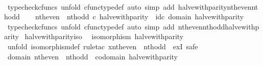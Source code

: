 \begin{isabellebody}
\ \ \ \ \isamarkupfalse%
\ {\isacharparenleft}{\kern0pt}typecheck{\isacharunderscore}{\kern0pt}cfuncs{\isacharcomma}{\kern0pt}\ unfold\ cfunc{\isacharunderscore}{\kern0pt}type{\isacharunderscore}{\kern0pt}def{\isacharcomma}{\kern0pt}\ auto\ simp\ add{\isacharcolon}{\kern0pt}\ halve{\isacharunderscore}{\kern0pt}with{\isacharunderscore}{\kern0pt}parity{\isacharunderscore}{\kern0pt}nth{\isacharunderscore}{\kern0pt}even{\isacharunderscore}{\kern0pt}nth{\isacharunderscore}{\kern0pt}odd{\isacharparenright}{\kern0pt}\isanewline
\ \ \isamarkupfalse%
\ {\isachardoublequoteopen}nth{\isacharunderscore}{\kern0pt}even\ {\isasymamalg}\ nth{\isacharunderscore}{\kern0pt}odd\ {\isasymcirc}\isactrlsub c\ halve{\isacharunderscore}{\kern0pt}with{\isacharunderscore}{\kern0pt}parity\ {\isacharequal}{\kern0pt}\ id\isactrlsub c\ {\isacharparenleft}{\kern0pt}domain\ halve{\isacharunderscore}{\kern0pt}with{\isacharunderscore}{\kern0pt}parity{\isacharparenright}{\kern0pt}{\isachardoublequoteclose}\isanewline
\ \ \ \ \isamarkupfalse%
\ {\isacharparenleft}{\kern0pt}typecheck{\isacharunderscore}{\kern0pt}cfuncs{\isacharcomma}{\kern0pt}\ unfold\ cfunc{\isacharunderscore}{\kern0pt}type{\isacharunderscore}{\kern0pt}def{\isacharcomma}{\kern0pt}\ auto\ simp\ add{\isacharcolon}{\kern0pt}\ nth{\isacharunderscore}{\kern0pt}even{\isacharunderscore}{\kern0pt}nth{\isacharunderscore}{\kern0pt}odd{\isacharunderscore}{\kern0pt}halve{\isacharunderscore}{\kern0pt}with{\isacharunderscore}{\kern0pt}parity{\isacharparenright}{\kern0pt}\isanewline
{}\isamarkupfalse%
%
\endisatagproof
{\isafoldproof}%
%
\isadelimproof
\isanewline
%
\endisadelimproof
\isanewline
{}\isamarkupfalse%
\ halve{\isacharunderscore}{\kern0pt}with{\isacharunderscore}{\kern0pt}parity{\isacharunderscore}{\kern0pt}iso{\isacharcolon}{\kern0pt}\isanewline
\ \ {\isachardoublequoteopen}isomorphism\ halve{\isacharunderscore}{\kern0pt}with{\isacharunderscore}{\kern0pt}parity{\isachardoublequoteclose}\isanewline
%
\isadelimproof
%
\endisadelimproof
%
\isatagproof
{}\isamarkupfalse%
\ {\isacharparenleft}{\kern0pt}unfold\ isomorphism{\isacharunderscore}{\kern0pt}def{\isacharcomma}{\kern0pt}\ rule{\isacharunderscore}{\kern0pt}tac\ x{\isacharequal}{\kern0pt}{\isachardoublequoteopen}nth{\isacharunderscore}{\kern0pt}even\ {\isasymamalg}\ nth{\isacharunderscore}{\kern0pt}odd{\isachardoublequoteclose}\ \ exI{\isacharcomma}{\kern0pt}\ safe{\isacharparenright}{\kern0pt}\isanewline
\ \ \isamarkupfalse%
\ {\isachardoublequoteopen}domain\ {\isacharparenleft}{\kern0pt}nth{\isacharunderscore}{\kern0pt}even\ {\isasymamalg}\ nth{\isacharunderscore}{\kern0pt}odd{\isacharparenright}{\kern0pt}\ {\isacharequal}{\kern0pt}\ codomain\ halve{\isacharunderscore}{\kern0pt}with{\isacharunderscore}{\kern0pt}parity{\isachardoublequoteclose}\isanewline

\end{isabellebody}
